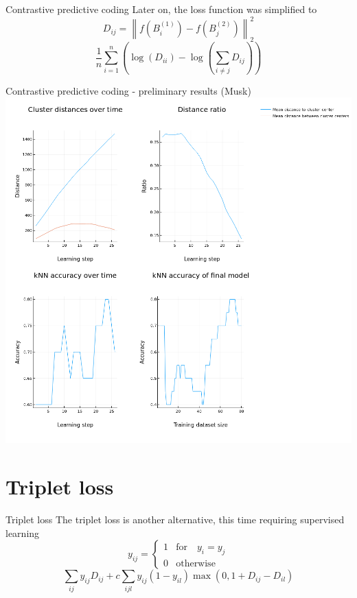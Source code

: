 \documentclass[10pt]{beamer}
\begin{document}
\begin{frame}{Contrastive predictive coding}
	Later on, the loss function was simplified to 
	\[ D_{ij} = \left\lVert f \left( B_i^{(1)} \right) - f \left( B_j^{(2)} \right) \right\rVert_2^2 \]
	\[ \frac{1}{n} \sum_{i = 1}^n \left( \log \left( D_{ii} \right) - \log \left( \sum_{i \neq j} D_{ij} \right) \right) \]
\end{frame}

\begin{frame}{Contrastive predictive coding - preliminary results (Musk)}
	\centering
	\includegraphics[width=0.7\pagewidth]{images/CPC.png}
\end{frame}

\section{Triplet loss}

\begin{frame}{Triplet loss}
	The triplet loss is another alternative, this time requiring supervised learning
	\[ y_{ij} =
\begin{cases}
	1 &\text{for} \quad y_i = y_j \\
	0 &\text{otherwise}
\end{cases}
\]
\[ \sum_{ij} y_{ij} D_{ij} + c \sum_{ijl} y_{ij} \left( 1 - y_{il} \right) \max \left( 0, 1 + D_{ij} - D_{il} \right) \]
\end{frame}
\end{document}

